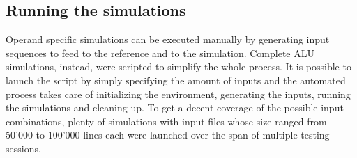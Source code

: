 \subsection{Running the simulations}
Operand specific simulations can be executed manually by generating input sequences to feed to the reference and
to the simulation. Complete ALU simulations, instead, were scripted to simplify the whole process.
It is possible to launch the script by simply specifying the amount of inputs and the automated process takes care of
initializing the environment, generating the inputs, running the simulations and cleaning up. To get a decent coverage
of the possible input combinations, plenty of simulations with input files whose size ranged from 50'000 to 100'000
lines each were launched over the span of multiple testing sessions.
